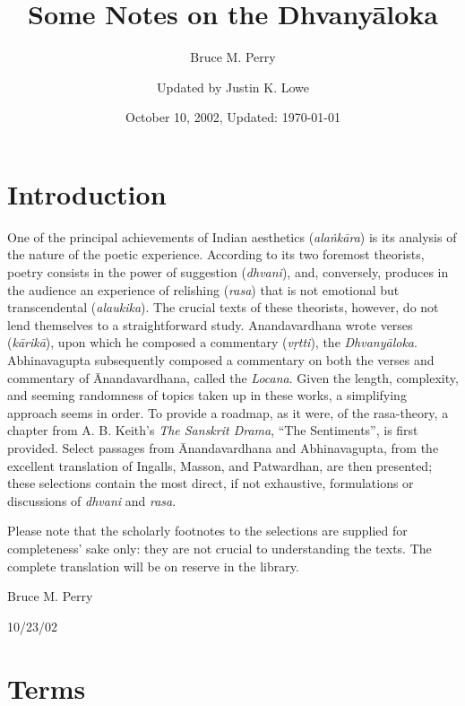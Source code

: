 \documentclass{article}
\title{Some Notes on the Dhvanyāloka}
\author{Bruce M. Perry \and Updated by Justin K. Lowe}
\date{October 10, 2002, Updated: \today}
\begin{document}
\maketitle

\section{Introduction}

One of the principal achievements of Indian aesthetics (\textit{alaṅkāra}) is its analysis of the nature of the poetic experience.
According to its two foremost theorists, poetry consists in the power of suggestion (\textit{dhvani}), and, conversely, produces in the audience an experience of relishing (\textit{rasa}) that is not emotional but transcendental (\textit{alaukika}).
The crucial texts of these theorists, however, do not lend themselves to a straightforward study.
Anandavardhana wrote verses (\textit{kārikā}), upon which he composed a commentary (\textit{vṛtti}), the \textit{Dhvanyāloka}.
Abhinavagupta subsequently composed a commentary on both the verses and commentary of Ānandavardhana, called the \textit{Locana}.
Given the length, complexity, and seeming randomness of topics taken up in these works, a simplifying approach seems in order.
To provide a roadmap, as it were, of the rasa-theory, a chapter from A. B. Keith's \textit{The Sanskrit Drama}, ``The Sentiments'', is first provided.
Select passages from Ānandavardhana and Abhinavagupta, from the excellent translation of Ingalls, Masson, and Patwardhan, are then presented; these selections contain the most direct, if not exhaustive, formulations or discussions of \textit{dhvani} and \textit{rasa}.

Please note that the scholarly footnotes to the selections are supplied for completeness' sake only: they are not crucial to understanding the texts.
The complete translation will be on reserve in the library.


Bruce M. Perry

10/23/02

\newpage


\section{Terms}
\end{document}
